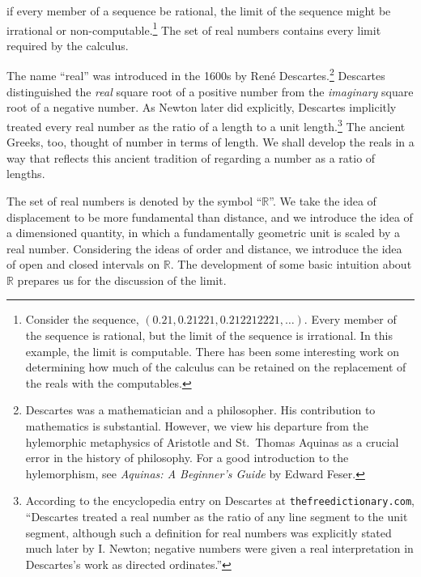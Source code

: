 if every member of a sequence be rational, the limit of the sequence might be
irrational or non-computable.\footnote{%
   Consider the sequence, $(0.21, 0.21221, 0.212212221, \ldots)$.  Every member
   of the sequence is rational, but the limit of the sequence is irrational. In
   this example, the limit is computable.  There has been some interesting work
   on determining how much of the calculus can be retained on the replacement
   of the reals with the computables.%
}
The set of real numbers contains every limit required by the calculus.

The name ``real'' was introduced in the 1600s by Ren\'e Descartes.\footnote{%
   Descartes was a mathematician and a philosopher. His contribution to
   mathematics is substantial.  However, we view his departure from the
   hylemorphic metaphysics of Aristotle and St.~Thomas Aquinas as a crucial
   error in the history of philosophy. For a good introduction to the
   hylemorphism, see {\it Aquinas: A Beginner's Guide\/} by Edward Feser.
}
Descartes distinguished the \emph{real} square root of a positive number from
the \emph{imaginary} square root of a negative number. As Newton later did
explicitly, Descartes implicitly treated every real number as the ratio of a
length to a unit length.\footnote{%
   According to the encyclopedia entry on Descartes at {\scriptsize
   \texttt{thefreedictionary.com}}, ``Descartes treated a real number as the
   ratio of any line segment to the unit segment, although such a definition
   for real numbers was explicitly stated much later by I. Newton; negative
   numbers were given a real interpretation in Descartes's work as directed
   ordinates.''%
}
The ancient Greeks, too, thought of number in terms of length. We shall develop
the reals in a way that reflects this ancient tradition of regarding a number
as a ratio of lengths.

The set of real numbers is denoted by the symbol ``$\mathbb{R}$''.  We take the
idea of displacement to be more fundamental than distance, and we introduce the
idea of a dimensioned quantity, in which a fundamentally geometric unit is
scaled by a real number.  Considering the ideas of order and distance, we
introduce the idea of open and closed intervals on $\mathbb{R}$.  The
development of some basic intuition about $\mathbb{R}$ prepares us for the
discussion of the limit.

